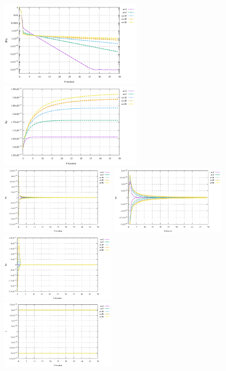 \begin{center}
\includegraphics[width=7cm]{python_codes/fieldstone_87/results/experiment_02/conv}
\includegraphics[width=7cm]{python_codes/fieldstone_87/results/experiment_02/vrms}\\
\includegraphics[width=5.7cm]{python_codes/fieldstone_87/results/experiment_02/du}
\includegraphics[width=5.7cm]{python_codes/fieldstone_87/results/experiment_02/dv}
\includegraphics[width=5.7cm]{python_codes/fieldstone_87/results/experiment_02/dp}\\
\includegraphics[width=5.7cm]{python_codes/fieldstone_87/results/experiment_02/u}

\end{center}
